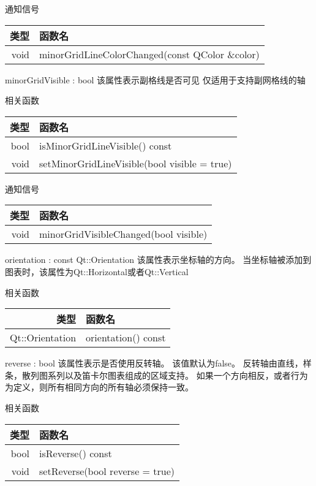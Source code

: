 通知信号

\begin{tabular}{|r|l|}
\hline
类型&函数名\\ 
\hline
void &	minorGridLineColorChanged(const QColor \&color)\\
\hline
\end{tabular}

\splitLine

minorGridVisible : bool 该属性表示副格线是否可见 仅适用于支持副网格线的轴

相关函数

\begin{tabular}{|r|l|}
\hline
类型&函数名\\ 
\hline
bool&	isMinorGridLineVisible() const\\
\hline
void & setMinorGridLineVisible(bool visible = true)\\
\hline
\end{tabular}

通知信号

\begin{tabular}{|r|l|}
\hline
类型&函数名\\ 
\hline
void& minorGridVisibleChanged(bool visible)\\
\hline
\end{tabular}

\splitLine

orientation : const Qt::Orientation 该属性表示坐标轴的方向。 当坐标轴被添加到图表时，该属性为Qt::Horizontal或者Qt::Vertical

相关函数

\begin{tabular}{|r|l|}
\hline
类型&函数名\\ 
\hline
Qt::Orientation	&orientation() const\\
\hline
\end{tabular}

\splitLine

reverse : bool 该属性表示是否使用反转轴。 该值默认为false。 
反转轴由直线，样条，散列图系列以及笛卡尔图表组成的区域支持。
如果一个方向相反，或者行为为定义，则所有相同方向的所有轴必须保持一致。

相关函数

\begin{tabular}{|r|l|}
\hline
类型&函数名\\ 
\hline
bool&	isReverse() const\\
\hline
void&	setReverse(bool reverse = true)\\
\hline
\end{tabular}

